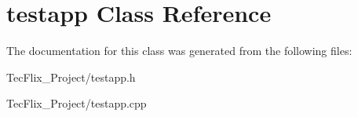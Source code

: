 \hypertarget{classtestapp}{}\section{testapp Class Reference}
\label{classtestapp}


The documentation for this class was generated from the following files\+:\begin{DoxyCompactItemize}
\item 
Tec\+Flix\+\_\+\+Project/testapp.\+h\item 
Tec\+Flix\+\_\+\+Project/testapp.\+cpp\end{DoxyCompactItemize}
